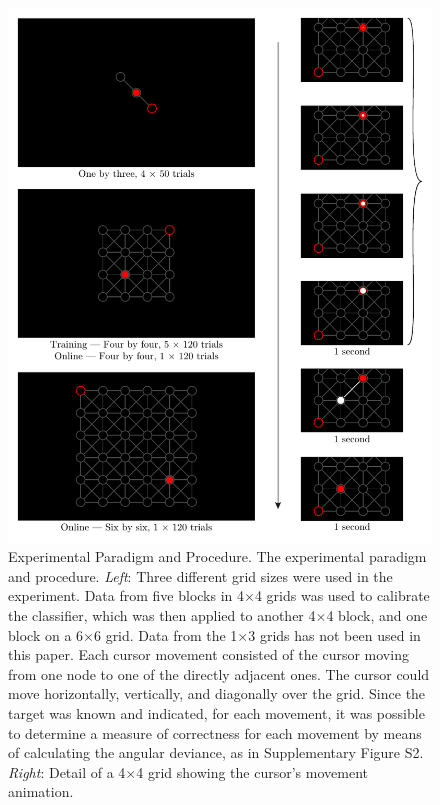 \begin{figure}[p]
    \renewcommand\thefigure{\ref{chapter:nat}.S1}
    \centering
    \includegraphics[width=\textwidth]{figures/nat-app-fig-s1.pdf}
    \caption[Experimental paradigm and procedure.]{Experimental Paradigm and Procedure. The experimental paradigm and procedure. \textit{Left}: Three different grid sizes were used in the experiment. Data from five blocks in 4$\times$4 grids was used to calibrate the classifier, which was then applied to another 4$\times$4 block, and one block on a 6$\times$6 grid. Data from the 1$\times$3 grids has not been used in this paper. Each cursor movement consisted of the cursor moving from one node to one of the directly adjacent ones. The cursor could move horizontally, vertically, and diagonally over the grid. Since the target was known and indicated, for each movement, it was possible to determine a measure of correctness for each movement by means of calculating the angular deviance, as in Supplementary Figure S2. \textit{Right}: Detail of a 4$\times$4 grid showing the cursor's movement animation.}
\end{figure}

